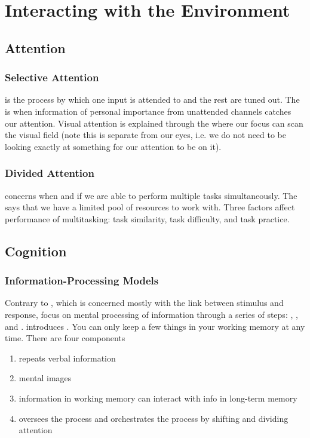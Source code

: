 \documentclass[../Psych_Soci_review.tex]{subfiles}
\begin{document}
\chapter{Interacting with the Environment}
\section{Attention}
\subsection{Selective Attention}
 is the process by which one input is attended to
and the rest are tuned out. The  is when
information of personal importance from unattended channels catches our
attention. Visual attention is explained through the 
where our focus can scan the visual field (note this is separate from our eyes,
i.e. we do not need to be looking exactly at something for our attention to be
on it).

\subsection{Divided Attention}
 concerns when and if we are able to perform multiple
tasks simultaneously. The  says that we
have a limited pool of resources to work with. Three factors affect performance
of multitasking: task similarity, task difficulty, and task practice.

\section{Cognition}
\subsection{Information-Processing Models}
Contrary to , which is concerned mostly with the link
between stimulus and response,  focus on
mental processing of information through a series of steps: ,
, and .  introduces . You can only keep a few
things in your working memory at any time. There are four components
\begin{enumerate}
  \item {} repeats verbal information
  \item {} mental images
  \item {} information in working memory can interact
    with info in long-term memory
  \item {} oversees the process and orchestrates the
    process by shifting and dividing attention
\end{enumerate}
\end{document}
